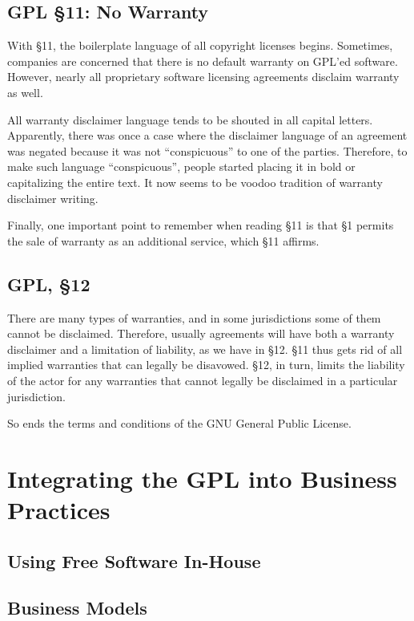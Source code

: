 \documentclass[12pt]{report}
\begin{document}
\section{GPL \S 11: No Warranty}
\label{GPLs11}

With \S 11, the boilerplate language of all copyright licenses begins.
Sometimes, companies are concerned that there is no default warranty on
GPL'ed software.  However, nearly all proprietary software licensing
agreements disclaim warranty as well.

All warranty disclaimer language tends to be shouted in all capital
letters.  Apparently, there was once a case where the disclaimer language
of an agreement was negated because it was not ``conspicuous'' to one of
the parties.  Therefore, to make such language ``conspicuous'', people
started placing it in bold or capitalizing the entire text.  It now seems
to be voodoo tradition of warranty disclaimer writing.

Finally, one important point to remember when reading \S 11 is that \S 1
permits the sale of warranty as an additional service, which  \S 11
affirms.

\section{GPL, \S 12}
\label{GPLs12}

There are many types of warranties, and in some jurisdictions some of them
cannot be disclaimed.  Therefore, usually agreements will have both a
warranty disclaimer and a limitation of liability, as we have in \S 12.
\S 11 thus gets rid of all implied warranties that can legally be
disavowed.  \S 12, in turn, limits the liability of the actor for any
warranties that cannot legally be disclaimed in a particular jurisdiction.

So ends the terms and conditions of the GNU General Public License.


\chapter{Integrating the GPL into Business Practices}

\section{Using Free Software In-House}

\section{Business Models}
\label{Business Models}
\end{document}
